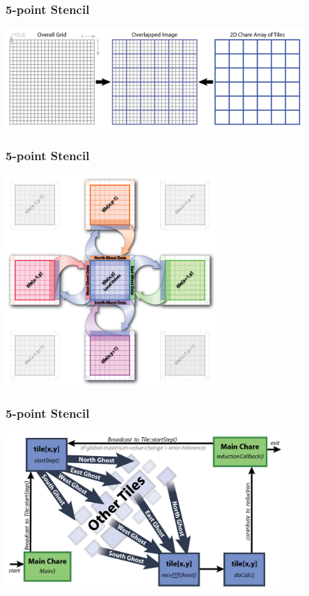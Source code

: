 \begin{frame}[fragile]
  \frametitle{5-point Stencil}
   \begin{center} \includegraphics[width=0.85\textwidth]{figures/2DJacobi_Decomposition.jpg} \end{center}
\end{frame}

\begin{frame}[fragile]
  \frametitle{5-point Stencil}
   \begin{center} \includegraphics[width=0.6\textwidth]{figures/2DJacobi_NeighborComm.jpg} \end{center}
\end{frame}

\begin{frame}[fragile]
  \frametitle{5-point Stencil}
   \begin{center} \includegraphics[width=0.8\textwidth]{figures/2DJacobi_LogicFlow.jpg} \end{center}
\end{frame}


